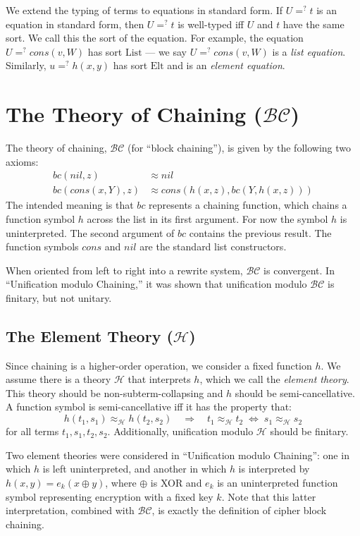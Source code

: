 \documentclass[11pt]{article}
\newcommand{\ueq}{=_{}^?}
\newcommand{\BC}{\mathcal{BC}}
\newcommand{\HH}{\mathcal{H}}
\newcommand{\Elt}{\mathrm{Elt}}
\newcommand{\List}{\mathrm{List}}
\newcommand{\Bc}{\mathit{bc}}
\newcommand{\Hh}{\mathit{h}}
\newcommand{\Cons}{\mathit{cons}}
\newcommand{\Nil}{\mathit{nil}}
\begin{document}
We extend the typing of terms to equations in standard form. If $U \ueq t$ is
an equation in standard form, then $U \ueq t$ is well-typed iff $U$ and $t$
have the same sort. We call this the sort of the equation. For example, the
equation $U \ueq \Cons(v, W)$ has sort $\List$ --- we say $U \ueq \Cons(v, W)$
is a \emph{list equation}. Similarly, $u \ueq h(x, y)$ has sort $\Elt$ and is
an \emph{element equation}.

\section{The Theory of Chaining (\texorpdfstring{$\BC$}{BC})}
\label{section:theory}

The theory of chaining, $\BC$ (for ``block chaining''), is given by the
following two axioms:
\begin{align*}
    \Bc(\Nil, z) &\approx \Nil \\
    \Bc(\Cons(x, Y), z) &\approx \Cons(\Hh(x, z), \Bc(Y, \Hh(x, z)))
\end{align*}
The intended meaning is that $\Bc$ represents a chaining function, which chains
a function symbol $\Hh$ across the list in its first argument. For now the
symbol $\Hh$ is uninterpreted. The second argument of $\Bc$ contains the
previous result. The function symbols $\Cons$ and $\Nil$ are the standard list
constructors.

When oriented from left to right into a rewrite system, $\BC$ is convergent.
In ``Unification modulo Chaining,'' it was shown that unification modulo $\BC$
is finitary, but not unitary.

\subsection{The Element Theory (\texorpdfstring{$\HH$}{H})}
\label{subsection:element-theory}

Since chaining is a higher-order operation, we consider a fixed function $\Hh$.
We assume there is a theory $\HH$ that interprets $\Hh$, which we call the
\emph{element theory}. This theory should be non-subterm-collapsing and
$\Hh$ should be semi-cancellative. A function symbol is semi-cancellative iff
it has the property that:
\[ \Hh(t_1, s_1) \approx_\HH^{} \Hh(t_2, s_2) \quad \Rightarrow \quad
t_1 \approx_\HH^{} t_2 \; \Leftrightarrow \; s_1 \approx_\HH^{} s_2 \]
for all terms $t_1, s_1, t_2, s_2$. Additionally, unification modulo $\HH$
should be finitary.

Two element theories were considered in ``Unification modulo Chaining'': one in
which $\Hh$ is left uninterpreted, and another in which $\Hh$ is interpreted by
$\Hh(x, y) = e_k(x \oplus y)$, where $\oplus$ is XOR and $e_k$ is an
uninterpreted function symbol representing encryption with a fixed key $k$.
Note that this latter interpretation, combined with $\BC$, is exactly the
definition of cipher block chaining.
\end{document}
